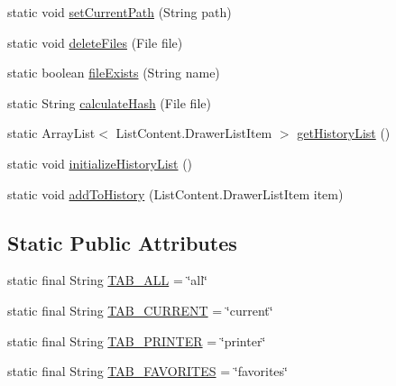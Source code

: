 \begin{DoxyCompactItemize}
\item 
static void \hyperlink{classandroid_1_1app_1_1printerapp_1_1library_1_1_library_controller_a09586fcb7969d0738adf41321cff72be}{set\+Current\+Path} (String path)
\item 
static void \hyperlink{classandroid_1_1app_1_1printerapp_1_1library_1_1_library_controller_a04f6d132513a96ae7b04945f7a23f1ce}{delete\+Files} (File file)
\item 
static boolean \hyperlink{classandroid_1_1app_1_1printerapp_1_1library_1_1_library_controller_ac3d08e0bb3d38b34fb1b62c40dd91559}{file\+Exists} (String name)
\item 
static String \hyperlink{classandroid_1_1app_1_1printerapp_1_1library_1_1_library_controller_a6183766e1375114b54dca15684152f00}{calculate\+Hash} (File file)
\item 
static Array\+List$<$ List\+Content.\+Drawer\+List\+Item $>$ \hyperlink{classandroid_1_1app_1_1printerapp_1_1library_1_1_library_controller_a2b09ee0f00d1a29ce17bdfca48a2a9bb}{get\+History\+List} ()
\item 
static void \hyperlink{classandroid_1_1app_1_1printerapp_1_1library_1_1_library_controller_a08a4119ad773efcb195134c6fcfc536a}{initialize\+History\+List} ()
\item 
static void \hyperlink{classandroid_1_1app_1_1printerapp_1_1library_1_1_library_controller_ae2cf2c1cfdf5b5342fd5381522fca746}{add\+To\+History} (List\+Content.\+Drawer\+List\+Item item)
\end{DoxyCompactItemize}
\subsection*{Static Public Attributes}
\begin{DoxyCompactItemize}
\item 
static final String \hyperlink{classandroid_1_1app_1_1printerapp_1_1library_1_1_library_controller_a854664a2ab36803c4edcc0e117e0d15c}{T\+A\+B\+\_\+\+A\+LL} = \char`\"{}all\char`\"{}
\item 
static final String \hyperlink{classandroid_1_1app_1_1printerapp_1_1library_1_1_library_controller_a7dc91659b930f50be31bc06800a5e3e6}{T\+A\+B\+\_\+\+C\+U\+R\+R\+E\+NT} = \char`\"{}current\char`\"{}
\item 
static final String \hyperlink{classandroid_1_1app_1_1printerapp_1_1library_1_1_library_controller_a82fd601a1fcafb7c5ce4ac2b6807ea41}{T\+A\+B\+\_\+\+P\+R\+I\+N\+T\+ER} = \char`\"{}printer\char`\"{}
\item 
static final String \hyperlink{classandroid_1_1app_1_1printerapp_1_1library_1_1_library_controller_adb9bd5d89efba9e9ceeda97be1896dcc}{T\+A\+B\+\_\+\+F\+A\+V\+O\+R\+I\+T\+ES} = \char`\"{}favorites\char`\"{}
\end{DoxyCompactItemize}


